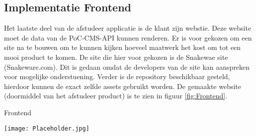 \subsection{Implementatie Frontend}
Het laatste deel van de afstudeer applicatie is de klant zijn webstie.
Deze website moet de data van de PoC-CMS-API kunnen renderen.
Er is voor gekozen om een site na te bouwen om te kunnen kijken hoeveel maatwerk het kost om tot een mooi product te komen.
De site die hier voor gekozen is de Snakewae site (Snakeware.com).
Dit is gedaan omdat de developers van de site kan aanspreken voor mogelijke onderstuening.
Verder is de repository beschikbaar gesteld, hierdoor kunnen de exact zelfde assets gebruikt worden.
De gemaakte website (doormiddel van het afstudeer product) is te zien in figuur \ref{fig:Frontend}.


\whitespace
\begin{graphic}
    \captionsetup{type=figure}
    \caption{Frontend}
    \texttt{[image: Placeholder.jpg]}
    \label{fig:Frontend}
\end{graphic}
